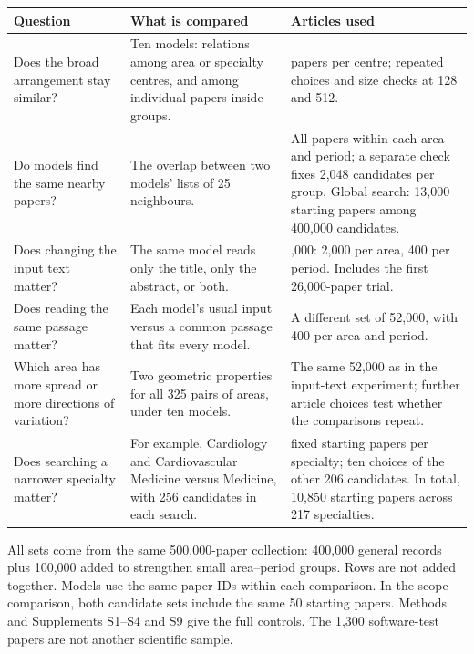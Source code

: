 \par\noindent\begin{minipage}{\linewidth}
\small
\setlength{\tabcolsep}{4pt}
\renewcommand{\arraystretch}{1.10}
\label{tab:T01}
\begin{tabular}{@{}>{\raggedright\arraybackslash}p{4.0cm}>{\raggedright\arraybackslash}p{5.4cm}>{\raggedright\arraybackslash}p{5.75cm}@{}}
\toprule
\textbf{Question} & \textbf{What is compared} & \textbf{Articles used} \\
\midrule
Does the broad arrangement stay similar? & Ten models: relations among area or specialty centres, and among individual papers inside groups. & 256 papers per centre; repeated choices and size checks at 128 and 512. \\
\addlinespace[8pt]
Do models find the same nearby papers? & The overlap between two models' lists of 25 neighbours. & All papers within each area and period; a separate check fixes 2,048 candidates per group. Global search: 13,000 starting papers among 400,000 candidates. \\
\addlinespace[8pt]
Does changing the input text matter? & The same model reads only the title, only the abstract, or both. & 52,000: 2,000 per area, 400 per period. Includes the first 26,000-paper trial. \\
\addlinespace[8pt]
Does reading the same passage matter? & Each model's usual input versus a common passage that fits every model. & A different set of 52,000, with 400 per area and period. \\
\addlinespace[8pt]
Which area has more spread or more directions of variation? & Two geometric properties for all 325 pairs of areas, under ten models. & The same 52,000 as in the input-text experiment; further article choices test whether the comparisons repeat. \\
\addlinespace[8pt]
Does searching a narrower specialty matter? & For example, Cardiology and Cardiovascular Medicine versus Medicine, with 256 candidates in each search. & 50 fixed starting papers per specialty; ten choices of the other 206 candidates. In total, 10,850 starting papers across 217 specialties. \\
\bottomrule
\end{tabular}
\par\smallskip
All sets come from the same 500,000-paper collection: 400,000 general records plus 100,000 added to strengthen small area--period groups. Rows are not added together. Models use the same paper IDs within each comparison. In the scope comparison, both candidate sets include the same 50 starting papers. Methods and Supplements S1--S4 and S9 give the full controls. The 1,300 software-test papers are not another scientific sample.
\end{minipage}\par
